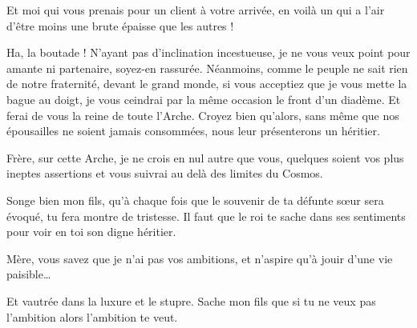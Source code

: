 \begin{drama}
   \elaspeaks {} Et moi qui vous prenais pour un client à votre arrivée, en voilà un qui a l’air d’être moins une brute épaisse que les autres !

   \elaspeaks Ha, la boutade ! N’ayant pas d’inclination incestueuse, je ne vous veux point pour amante ni partenaire, soyez-en rassurée. Néanmoins, comme le peuple ne sait rien de notre fraternité, devant le grand monde, si vous acceptiez que je vous mette la bague au doigt, je vous ceindrai par la même occasion le front d’un diadème. Et ferai de vous la reine de toute l’Arche. Croyez bien qu’alors, sans même que nos épousailles ne soient jamais consommées, nous leur présenterons un héritier.

   \elaspeaks Frère, sur cette Arche, je ne crois en nul autre que vous, quelques soient vos plus ineptes assertions et vous suivrai au delà des limites du Cosmos.
\end{drama}


\scene

\StageDirII{\reine, \vladimir}



\begin{drama}

  \reinespeaks Songe bien mon fils, qu’à chaque fois que le souvenir de ta défunte sœur sera évoqué, tu fera montre de tristesse. Il faut que le roi te sache dans ses sentiments pour voir en toi son digne héritier.

  \vladimirspeaks Mère, vous savez que je n’ai pas vos ambitions, et n’aspire qu’à jouir d’une vie paisible…

  \reinespeaks Et vautrée dans la luxure et le stupre. Sache mon fils que si tu ne veux pas l’ambition alors l’ambition te veut.
\end{drama}

\scene

\StageDirII{\roi, \reine, \kingsgards, \vladimir}

\newcommand\lacrimamendnote{
  Traduction :
  \begin{verse}
    \em
    Le sang avec une larme ruisselle\\
    Sur les nervures du marbre\\
    Et souille le verre\\
    Que traverse la lumière noire
  \end{verse}
}%

